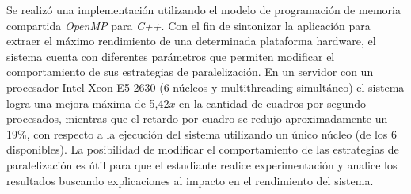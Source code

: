 Se realizó una implementación utilizando el modelo de programación de memoria
compartida \emph{OpenMP} para \emph{C++}. Con el fin de sintonizar la aplicación
para extraer el máximo rendimiento de una determinada plataforma hardware, el
sistema cuenta con diferentes parámetros que permiten modificar el
comportamiento de sus estrategias de paralelización. En un servidor con un
procesador Intel Xeon E5-2630 (6 núcleos y multithreading simultáneo) el sistema
logra una mejora máxima de 5,42$x$ en la cantidad de cuadros por segundo
procesados, mientras que el retardo por cuadro se redujo aproximadamente un
19\%, con respecto a la ejecución del sistema utilizando un único núcleo (de los
6 disponibles). La posibilidad de modificar el comportamiento de las estrategias
de paralelización es útil para que el estudiante realice experimentación y
analice los resultados buscando explicaciones al impacto en el rendimiento del
sistema.

\vfill
\pagebreak
